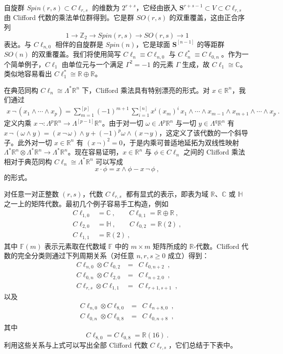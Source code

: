 \documentclass[11pt,a4paper]{ctexart}
\begin{document}
自旋群 \(Spin(r,s)\subset C\ell_{r,s}\) 的维数为 \(2^{r+s}\)，它经由嵌入 \({\mathbf S}^{r+s-1}\subset V\subset C\ell_{r,s}\) 由 Clifford 代数的乘法单位群得到。它是群 \(SO(r,s)\) 的双重覆盖，这由正合序列 \[1\longrightarrow{\mathbb{Z}}_2\longrightarrow Spin(r,s)\longrightarrow SO(r,s)
\longrightarrow 1\] 表达。与 \(C\ell_{n,0}\) 相伴的自旋群是 \(Spin(n)\)，它是球面 \({\mathbf S}^[n-1]\) 的等距群 \(SO(n)\) 的双重覆盖。我们将使用简写 \(C\ell_n\equiv C\ell_{n,0}\) 与 \(C\ell_n^{*}\equiv C\ell_{0,n}\)。作为一个简单例子，\(C\ell_1\) 由单位元与一个满足 \(\Gamma^2=-1\) 的元素 \(\Gamma\) 生成，故 \(C\ell_1\cong{\mathbb{C}}\)。类似地容易看出 \(C\ell^*_{1}\cong{\mathbb{R}}\oplus{\mathbb{R}}\)。

在典范同构 \(C\ell_n\cong \Lambda^*{\mathbb{R}}^n\) 下，Clifford 乘法具有特别漂亮的形式。对 \(x\in{\mathbb{R}}^n\)，我们通过 \[\begin{matrix}
x\,\neg\,(x_1\wedge\cdots\wedge x_p)=\sum_{m=1}^[p](-1)^{m+1}\,
\sum_{i=1}^[n]x^i(x_m)^i\,
x_1\wedge\cdots\wedge x_{m-1}\wedge x_{m+1}\wedge\cdots\wedge x_p\ .
\end{matrix}\] 定义内乘 \(x\,\neg:\Lambda^p{\mathbb{R}}^n\rightarrow\Lambda^[p-1]{\mathbb{R}}^n\)。由于对一切 \(\omega\in\Lambda^p{\mathbb{R}}^n\) 与一切 \(y\in\Lambda^q{\mathbb{R}}^n\) 有 \(x\,\neg\,(\omega\wedge y)=(x\,\neg\,\omega)\wedge y+(-1)^p
\omega\wedge(x\,\neg\,y)\)，这定义了该代数的一个斜导子。此外对一切 \(x\in{\mathbb{R}}^n\) 有 \((x\,\neg)^2=0\)，于是内乘可普适地延拓为双线性映射 \(\Lambda^*{\mathbb{R}}^n\otimes\Lambda^*{\mathbb{R}}^n\rightarrow
\Lambda^*{\mathbb{R}}^n\)。现在容易证明，\(x\in{\mathbb{R}}^n\) 与 \(\phi\in C\ell_n\) 之间的 Clifford 乘法相对于典范同构 \(C\ell_n\cong\Lambda^*{\mathbb{R}}^n\) 可以写成 \[x\cdot\phi=x\wedge\phi-x\,\neg\,\phi\ ,\] 的形式。

对任意一对正整数 \((r,s)\)，代数 \(C\ell_{r,s}\) 都有显式的表示，即表为域 \({\mathbb{R}}\)、\({\mathbb{C}}\) 或 \({\mathbb{H}}\) 之一上的矩阵代数。最初几个例子容易手工构造，例如 \[\begin{matrix}
C\ell_{1,0} &= {\mathbb{C}}\ , \qquad C\ell_{0,1} = {\mathbb{R}}\oplus{\mathbb{R}}\ ,\\
C\ell_{2,0} &= {\mathbb{H}}\ , \qquad C\ell_{0,2} = {\mathbb{R}}(2)\ ,\\
C\ell_{1,1} &= {\mathbb{R}}(2)\ ,
\end{matrix}\] 其中 \({\mathbb{F}}(m)\) 表示元素取在代数域 \(\mathbb{F}\) 中的 \(m\times m\) 矩阵所成的 \({\mathbb{R}}\)-代数。Clifford 代数的完全分类则通过下列周期关系（对任意 \(n,r,s\geq 0\) 成立）得到： \[\begin{matrix}
C\ell_{n,0}\otimes C\ell_{0,2}&=&C\ell_{0,n+2}\ ,\\
C\ell_{0,n}\otimes C\ell_{2,0}&=&C\ell_{n+2,0}\ ,\\
C\ell_{r,s}\otimes C\ell_{1,1}&=&C\ell_{r+1,s+1}\ ,
\end{matrix}\] 以及 \[\begin{matrix}
C\ell_{n,0}\otimes C\ell_{8,0}&=&C\ell_{n+8,0}\ ,\\
C\ell_{0,n}\otimes C\ell_{0,8}&=&C\ell_{0,n+8}\ ,
\end{matrix}\] 其中 \[C\ell_{8,0}=C\ell_{0,8}={\mathbb{R}}(16)\ .\] 利用这些关系与上式可以写出全部 Clifford 代数 \(C\ell_{r,s}\)，它们总结于下表中。
\end{document}
